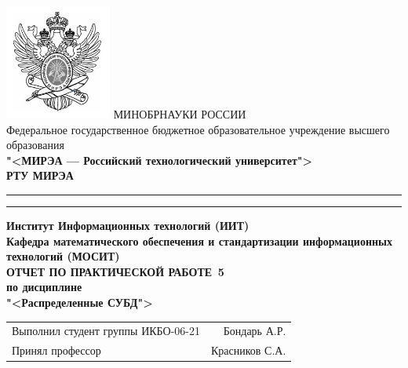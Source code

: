 \begin{titlepage}
	\thispagestyle{fancy}
	\renewcommand{\headrulewidth}{0pt}

	\centering
	\includegraphics[scale=0.5]{../res/logo} \break %
	МИНОБРНАУКИ РОССИИ\\
	Федеральное государственное бюджетное образовательное учреждение
	высшего образования\\
	\textbf{"<МИРЭА --- Российский технологический университет">}\\
	\textbf{РТУ МИРЭА}\\
	\bigskip \hrule \smallskip \hrule
	\vfill
	\vfill
	\textbf{Институт Информационных технологий (ИИТ)}\\
	\textbf{Кафедра математического обеспечения
		и стандартизации информационных технологий (МОСИТ)}\\
	\vfill
	\vfill
	\textbf{ОТЧЕТ ПО ПРАКТИЧЕСКОЙ РАБОТЕ \No\,5}\\
	\textbf{по дисциплине}\\
	\textbf{"<Распределенные СУБД">}
	\vfill
	\vfill
	\vfill
	\vfill
	\begin{tabular}{lr}
		Выполнил студент группы ИКБО-06-21 & Бондарь А.Р.\\
		Принял профессор & Красников С.А.\\
	\end{tabular}
	\vfill
	\vfill
	\vfill
\end{titlepage}
\setcounter{page}{2}
\clearpage

